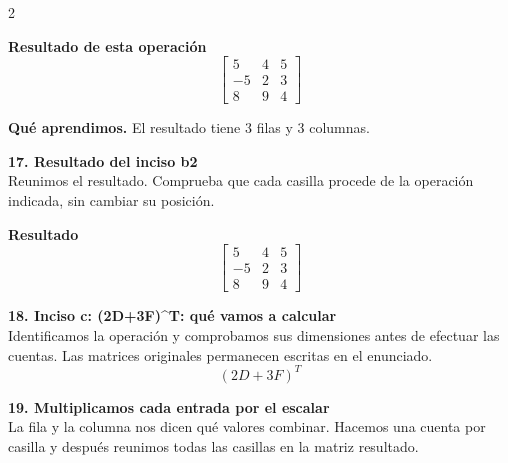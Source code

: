 \documentclass[11pt,a4paper,landscape]{article}
\begin{document}
\begin{multicols*}{2}
\begin{minipage}{\linewidth}
\par\smallskip \textbf{Resultado de esta operación}\[\begin{bmatrix}5 & 4 & 5\\-5 & 2 & 3\\8 & 9 & 4\end{bmatrix}\]
\par\smallskip\textbf{Qué aprendimos.} El resultado tiene 3 filas y 3 columnas.
\end{minipage}\par\medskip
\noindent\begin{minipage}{\linewidth}\textbf{17. Resultado del inciso b2}\\[2pt]Reunimos el resultado. Comprueba que cada casilla procede de la operación indicada, sin cambiar su posición.
\par\smallskip \textbf{Resultado}\[\begin{bmatrix}5 & 4 & 5\\-5 & 2 & 3\\8 & 9 & 4\end{bmatrix}\]
\end{minipage}\par\medskip
\noindent\begin{minipage}{\linewidth}\textbf{18. Inciso c: (2D+3F)\textasciicircum{}T: qué vamos a calcular}\\[2pt]Identificamos la operación y comprobamos sus dimensiones antes de efectuar las cuentas. Las matrices originales permanecen escritas en el enunciado.
\[(2D+3F)^T\]
\end{minipage}\par\medskip
\noindent\begin{minipage}{\linewidth}\textbf{19. Multiplicamos cada entrada por el escalar}\\[2pt]La fila y la columna nos dicen qué valores combinar. Hacemos una cuenta por casilla y después reunimos todas las casillas en la matriz resultado.
\par{}\par\smallskip

\end{minipage}
\end{multicols*}
\end{document}

